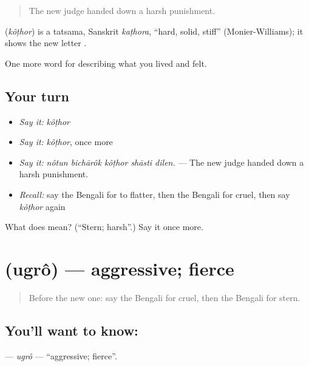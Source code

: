 \begin{quote}
The new judge handed down a harsh punishment.
\end{quote}

\begin{cousinweb}
\textbf{} (\emph{kôṭhor}) is a tatsama, Sanskrit \emph{kaṭhora}, \textquotedblleft{}hard, solid, stiff\textquotedblright{} (Monier-Williams); it shows the new letter .
\end{cousinweb}

\begin{grammarlens}[title={What you've built}]
One more word for describing what you lived and felt.
\end{grammarlens}

\subsection*{Your turn}
\begin{itemize}
\raggedright
  \item \emph{Say it:} \emph{kôṭhor}
  \item \emph{Say it:} \emph{kôṭhor}, once more
  \item \emph{Say it:} \emph{nôtun bichārôk kôṭhor shāsti dilen.} — The new judge handed down a harsh punishment.
  \item \emph{Recall:} say the Bengali for to flatter, then the Bengali for cruel, then say \emph{kôṭhor} again
\end{itemize}

\begin{tcolorbox}[breakable,colback=teal!4,colframe=teal!35!black,title={Before you move on}]
What does  mean? (\textquotedblleft{}Stern; harsh\textquotedblright{}.) Say it once more.
\end{tcolorbox}
\section[\texorpdfstring{\bn{উগ্র} (ugrô)}{উগ্র (ugrô)}]{ (ugrô) — aggressive; fierce}

\label{lesson:BN-C460-ugro}



\begin{quote}
Before the new one: say the Bengali for cruel, then the Bengali for stern.
\end{quote}

\subsection*{You'll want to know: }
\textbf{} — \emph{ugrô} — \textquotedblleft{}aggressive; fierce\textquotedblright{}.

